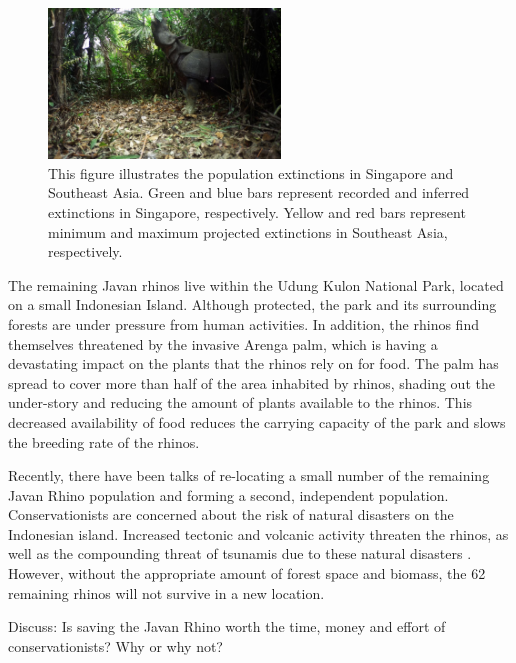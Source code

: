    \begin{figure}[ht]
    \centering
        \includegraphics[width = 0.55\textwidth]{graphics/javan.jpg}
        \caption{This figure illustrates the population extinctions in Singapore and Southeast Asia. Green and blue bars represent recorded and inferred extinctions in Singapore, respectively. Yellow and red bars represent minimum and maximum projected extinctions in Southeast Asia, respectively. \citep{sodhi2004southeast}}
    \end{figure}

  
  The remaining Javan rhinos live within the Udung Kulon National Park, located on a small Indonesian Island. Although protected, the park and its surrounding forests are under pressure from human activities. In addition, the rhinos find themselves threatened by the invasive Arenga palm, which is having a devastating impact on the plants that the rhinos rely on for food. The palm has spread to cover more than half of the area inhabited by rhinos, shading out the under-story and reducing the amount of plants available to the rhinos. This decreased availability of food reduces the carrying capacity of the park and slows the breeding rate of the rhinos.

  Recently, there have been talks of re-locating a small number of the remaining Javan Rhino population and forming a second, independent population.  Conservationists are concerned about the risk of natural disasters on the Indonesian island. Increased tectonic and volcanic activity threaten the rhinos, as well as the compounding threat of tsunamis due to these natural disasters \citep{setiawan2018preventing}.  However, without the appropriate amount of forest space and biomass, the 62 remaining rhinos will not survive in a new location. 

\begin{problem}	
	Discuss:
Is saving the Javan Rhino worth the time, money and effort of conservationists? Why or why not? 
\end{problem}


